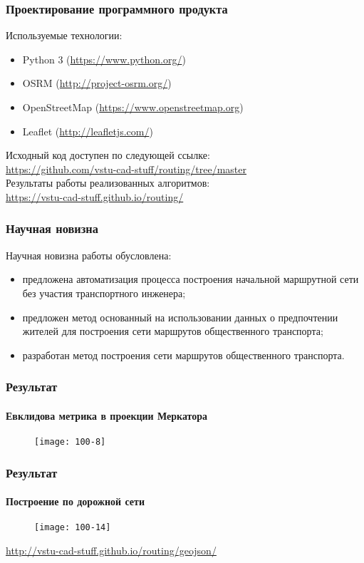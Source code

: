 \begin{frame}
    \frametitle{Проектирование программного продукта}
    \small
    Используемые технологии:
    \begin{itemize}
        \item Python 3 (\url{https://www.python.org/})
        \item OSRM (\url{http://project-osrm.org/})
        \item OpenStreetMap (\url{https://www.openstreetmap.org})
        \item Leaflet (\url{http://leafletjs.com/})
    \end{itemize}
    Исходный код доступен по следующей ссылке:\\
    \url{https://github.com/vstu-cad-stuff/routing/tree/master}\\\vspace{1em}
    Результаты работы реализованных алгоритмов:\\
    \url{https://vstu-cad-stuff.github.io/routing/}
\end{frame}

\begin{frame}
    \frametitle{Научная новизна}
    Научная новизна работы обусловлена:
    \begin{itemize}
        \item предложена автоматизация процесса построения начальной маршрутной сети без участия 
            транспортного инженера;
        \item предложен метод основанный на использовании данных о предпочтении жителей для построения 
            сети маршрутов общественного транспорта;
        \item разработан метод построения сети маршрутов общественного транспорта.
    \end{itemize}
\end{frame}

\begin{frame}
    \frametitle{Результат}
    \framesubtitle{Евклидова метрика в проекции Меркатора}
    \begin{figure}[ht!]
        \centering
        \texttt{[image: 100-8]}
    \end{figure}
\end{frame}

\begin{frame}
    \frametitle{Результат}
    \framesubtitle{Построение по дорожной сети}
    \begin{figure}[ht!]
        \centering
        \texttt{[image: 100-14]}
    \end{figure}
    \url{http://vstu-cad-stuff.github.io/routing/geojson/}
\end{frame}


